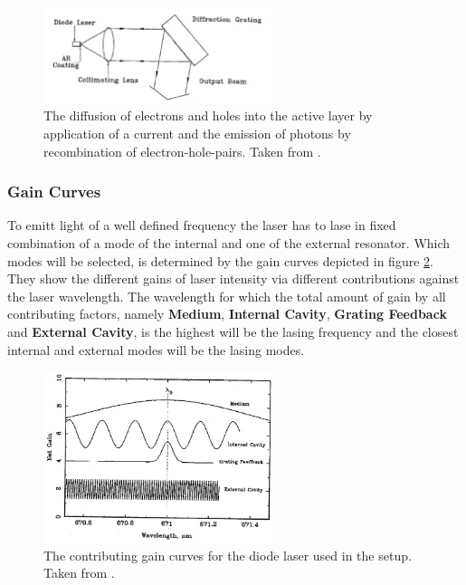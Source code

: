             \begin{figure}[h]
                \centering
                \includegraphics[width = 0.6\textwidth]{pictures/littrow.png}
                \caption{The diffusion of electrons and holes into the active layer by application of a current and the emission of photons by recombination of electron-hole-pairs. Taken from \cite{tu_dortmund_versuchsanleitung_2022-1}.}
                \label{fig:littrow}
            \end{figure}
        
            \FloatBarrier


        \subsubsection{Gain Curves}
            To emitt light of a well defined frequency the laser has to lase in fixed combination of a mode of the internal and one of the external resonator. Which modes will be selected, is determined by
            the gain curves depicted in figure \ref{fig:gain_curves}. They show the different gains of laser intensity via different contributions against the laser wavelength. The wavelength for which the
            total amount of gain by all contributing factors, namely \textbf{Medium}, \textbf{Internal Cavity}, \textbf{Grating Feedback} and \textbf{External Cavity}, is the highest will be the lasing 
            frequency and the closest internal and external modes will be the lasing modes.\newline

            \begin{figure}[h]
                \centering
                \includegraphics[width = 0.6\textwidth]{pictures/gain_curves.png}
                \caption{The contributing gain curves for the diode laser used in the setup. Taken from \cite{tu_dortmund_versuchsanleitung_2022-1}.}
                \label{fig:gain_curves}
            \end{figure}
        
